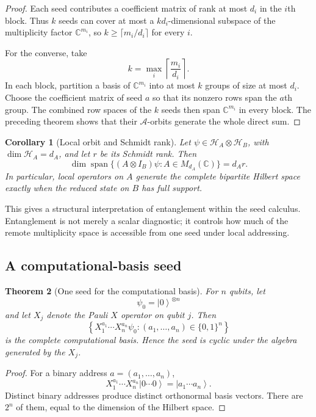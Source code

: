 \documentclass[11pt]{article}
\newtheorem{theorem}{Theorem}[section]
\newtheorem{corollary}[theorem]{Corollary}
\theoremstyle{definition}
\theoremstyle{remark}
\newcommand{\cA}{\mathcal A}
\newcommand{\cH}{\mathcal H}
\newcommand{\bbC}{\mathbb C}
\newcommand{\ket}[1]{\left|#1\right\rangle}
\begin{document}
\begin{proof}
Each seed contributes a coefficient matrix of rank at most $d_i$ in the $i$th block. Thus $k$ seeds can cover at most a $kd_i$-dimensional subspace of the multiplicity factor $\bbC^{m_i}$, so $k\ge\lceil m_i/d_i\rceil$ for every $i$.

For the converse, take
\[
k=\max_i\left\lceil\frac{m_i}{d_i}\right\rceil.
\]
In each block, partition a basis of $\bbC^{m_i}$ into at most $k$ groups of size at most $d_i$. Choose the coefficient matrix of seed $a$ so that its nonzero rows span the $a$th group. The combined row spaces of the $k$ seeds then span $\bbC^{m_i}$ in every block. The preceding theorem shows that their $\cA$-orbits generate the whole direct sum.
\end{proof}

\begin{corollary}[Local orbit and Schmidt rank]
Let $\psi\in\cH_A\otimes\cH_B$, with $\dim\cH_A=d_A$, and let $r$ be its Schmidt rank. Then
\[
\boxed{
\dim\operatorname{span}\{(A\otimes I_B)\psi:A\in M_{d_A}(\bbC)\}
=d_A r.
}
\]
In particular, local operators on $A$ generate the complete bipartite Hilbert space exactly when the reduced state on $B$ has full support.
\end{corollary}

This gives a structural interpretation of entanglement within the seed calculus. Entanglement is not merely a scalar diagnostic; it controls how much of the remote multiplicity space is accessible from one seed under local addressing.

\subsection{A computational-basis seed}

\begin{theorem}[One seed for the computational basis]
For $n$ qubits, let
\[
\psi_0=\ket{0}^{\otimes n}
\]
and let $X_j$ denote the Pauli $X$ operator on qubit $j$. Then
\[
\left\{
X_1^{a_1}\cdots X_n^{a_n}\psi_0:
(a_1,\ldots,a_n)\in\{0,1\}^n
\right\}
\]
is the complete computational basis. Hence the seed is cyclic under the algebra generated by the $X_j$.
\end{theorem}

\begin{proof}
For a binary address $a=(a_1,\ldots,a_n)$,
\[
X_1^{a_1}\cdots X_n^{a_n}\ket{0\cdots0}
=
\ket{a_1\cdots a_n}.
\]
Distinct binary addresses produce distinct orthonormal basis vectors. There are $2^n$ of them, equal to the dimension of the Hilbert space.
\end{proof}
\end{document}
